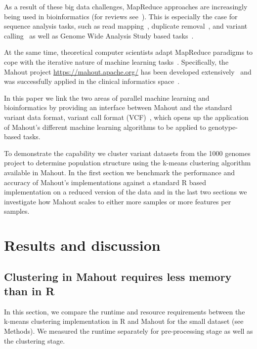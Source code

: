 \documentclass{bioinfo}
\begin{document}
As a result of these big data challenges, MapReduce approaches are increasingly being used in bioinformatics (for reviews see~\cite{Zou2013, Qiu2010,Taylor2010}). This is especially the case for sequence analysis tasks, such as read mapping~\cite{Schatz2009}, duplicate removal~\cite{Jourdren2012}, and variant calling~\cite{Langmead2009, McKenna2010} as well as Genome Wide Analysis Study based tasks~\cite{Huang2013, Guo2014}.


At the same time, theoretical computer scientists adapt MapReduce paradigms to cope with the iterative nature of machine learning tasks~\cite{Chu2009}. Specifically, the Mahout project \url{https://mahout.apache.org/} has been developed extensively~\cite{Ranger2007, Owen2011} and was successfully applied in the clinical informatics space~\cite{Dong2013}.

In this paper we link the two areas of parallel machine learning and bioinformatics by providing an interface between Mahout and the standard variant data format, variant call format (VCF)~\cite{1KG2012}, which opens up the application of Mahout's different machine learning algorithms to be applied to genotype-based tasks. 

To demonstrate the capability we cluster variant datasets from the 1000 genomes project to determine population structure using the k-means clustering algorithm available in Mahout. In the first section we benchmark the performance and accuracy of Mahout's implementations against a standard R based implementation on a reduced version of the data and in the last two sections we investigate how Mahout scales to either more samples or more features per samples.   



\section*{Results and discussion}

\subsection*{Clustering in Mahout requires less memory than in R}
In this section, we compare the runtime and resource requirements between the k-means clustering implementation in R and Mahout for the small \NinteenPhaseone{} dataset (see Methods). 
We measured the runtime separately for pre-processing stage as well as the clustering stage. 
\end{document}
